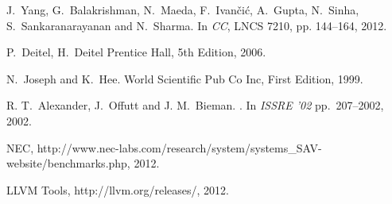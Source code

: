 \documentclass[a4paper]{llncs}
\begin{document}
{\begin{thebibliography}{10}
J.~Yang, G.~Balakrishman, N.~Maeda, F.~Ivan\v{c}i\'c, A.~Gupta, N.~Sinha, S.~Sankaranarayanan and N.~Sharma.
\newblock In {\em CC}, LNCS 7210, pp. 144--164, 2012.

P.~Deitel, H.~Deitel
\newblock Prentice Hall, 5th Edition, 2006.

N.~Joseph and K.~Hee.
\newblock World Scientific Pub Co Inc, First Edition, 1999.

R. T.~Alexander, J.~Offutt and J. M.~Bieman. .
\newblock In {\em ISSRE '02} pp.~207--2002, 2002.

NEC, http://www.nec-labs.com/research/system/systems\_SAV-website/benchmarks.php, 2012.

LLVM Tools, http://llvm.org/releases/, 2012.

\end{thebibliography}}
\end{document}
